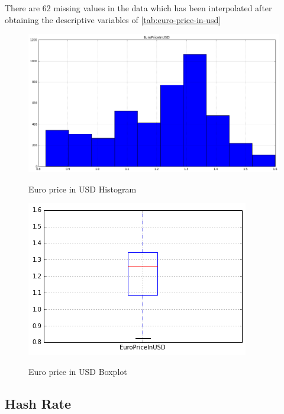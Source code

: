 There are 62 missing values in the data which has been interpolated
after obtaining the descriptive variables of
\autoref{tab:euro-price-in-usd}

\begin{figure}[bth]
  \myfloatalign
  {\includegraphics[width=1\linewidth]
    {gfx/euro-price-in-usd-histogram}} 
  \caption{Euro price in USD Histogram}
  \label{fig:euro-price-in-usd-histogram}
\end{figure}

\begin{figure}[bth]
  \myfloatalign
  {\includegraphics[width=1\linewidth]
    {gfx/euro-price-in-usd-boxplot}}
  \caption{Euro price in USD Boxplot}
  \label{fig:euro-price-in-usd-boxplot}
\end{figure}

\clearpage


\subsection{Hash Rate}
\label{sec:hash-rate}

